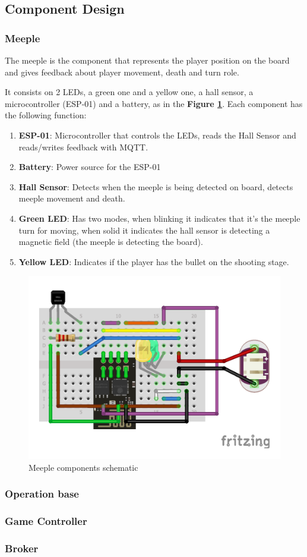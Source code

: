 \documentclass[../main.tex]{subfiles}
\begin{document}
\subsection{Component Design}

\subsubsection{Meeple}

The meeple is the component that represents the player position on the board and gives feedback about player movement, death and turn role.

It consists on 2 LEDs, a green one and a yellow one, a hall sensor, a microcontroller (ESP-01) and a battery, as in the \textbf{Figure \ref{fig:meeple}}. Each component has the following function:

\begin{enumerate}
    \item \textbf{ESP-01}: Microcontroller that controls the LEDs, reads the Hall Sensor and reads/writes feedback with MQTT.
    \item \textbf{Battery}: Power source for the ESP-01
    \item \textbf{Hall Sensor}: Detects when the meeple is being detected on board, detects meeple movement and death.
    \item \textbf{Green LED}: Has two modes, when blinking it indicates that it's the meeple turn for moving, when solid it indicates the hall sensor is detecting a magnetic field (the meeple is detecting the board).
    \item \textbf{Yellow LED}: Indicates if the player has the bullet on the shooting stage.
\end{enumerate}

\begin{figure}[!htb]
    \centering
    \includegraphics[width= 0.5\linewidth]{../media/figures/schematic_meeple.pdf}
    \caption{Meeple components schematic}
    \label{fig:meeple}
\end{figure}

\subsubsection{Operation base}

\subsubsection{Game Controller}



\subsubsection{Broker}
\end{document}
